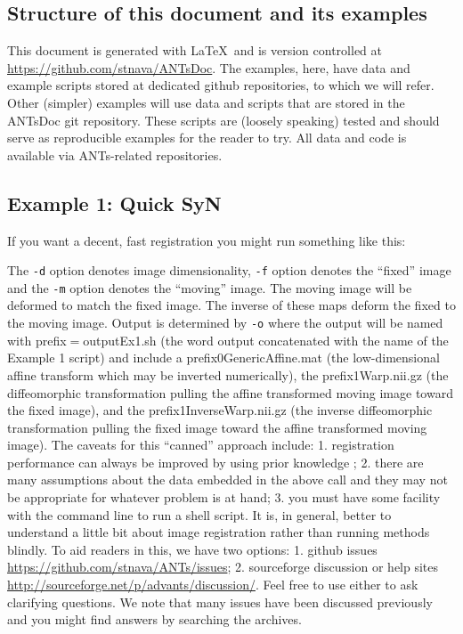 \documentclass{InsightArticle}
\begin{document}
\subsection{Structure of this document and its examples}
This document is generated with \LaTeX ~and is version controlled at
\href{https://github.com/stnava/ANTsDoc}{https://github.com/stnava/ANTsDoc}.
The examples, here, have data and example scripts stored at dedicated
github repositories, to which we will refer.  Other (simpler) examples will use
data and scripts that are stored in the ANTsDoc git repository.  These
scripts are (loosely speaking) tested and should serve as reproducible
examples for the reader to try.  All data and code is available via
ANTs-related repositories.

\subsection{Example 1: Quick SyN}
If you want a decent, fast registration you might run something like this:

The \texttt{-d} option denotes image dimensionality, \texttt{-f} option denotes the ``fixed'' image and the \texttt{-m} option
denotes the ``moving'' image.  The moving image will be deformed to
match the fixed image.  The inverse of these maps deform the fixed to
the moving image.  Output is determined by \texttt{-o} where the output
will be named with prefix$=$outputEx1.sh (the word output concatenated
with the name of the Example 1 script) and include a
prefix0GenericAffine.mat (the low-dimensional affine transform which
may be inverted numerically), the prefix1Warp.nii.gz (the
diffeomorphic transformation pulling the affine transformed moving
image toward the fixed image), and the prefix1InverseWarp.nii.gz (the inverse
diffeomorphic transformation pulling the fixed image toward the affine transformed moving
image).
The caveats for this ``canned'' approach include:  1. registration
performance can always be improved by using prior knowledge
\cite{Wolpert1997}; 2. there are many assumptions about the data
embedded in the above call and they may not be appropriate for
whatever problem is at hand; 3. you must have some facility with the command line
to run a shell script.  It is, in general, better to understand a
little bit about image registration rather than running methods
blindly.   To aid readers in this, we have two options: 1. github
issues
\href{https://github.com/stnava/ANTs/issues}{https://github.com/stnava/ANTs/issues};
2.  sourceforge discussion or help sites
\href{http://sourceforge.net/p/advants/discussion/}{http://sourceforge.net/p/advants/discussion/}.
Feel free to use either to ask clarifying questions.  We note that many
issues have been discussed previously and you might find answers by
searching the archives.
\end{document}
